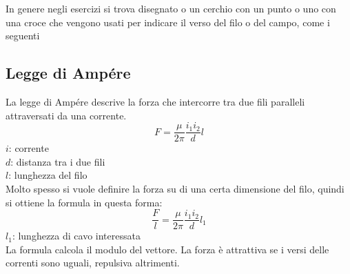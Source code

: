 In genere negli esercizi si trova disegnato o un cerchio con un punto o uno con una croce che
vengono usati per indicare il verso del filo o del campo, come i seguenti

\begin{center}
\end{center}

\subsection{Legge di Ampére}
La legge di Ampére descrive la forza che intercorre tra due fili paralleli attraversati da una
corrente.
\begin{equation*}
F = \frac{\mu}{2\pi}\frac{i_1i_2}{d}l
\end{equation*}
$i$: corrente\\
$d$: distanza tra i due fili\\
$l$: lunghezza del filo\\ [\baselineskip]
Molto spesso si vuole definire la forza su di una certa dimensione del filo, quindi si ottiene
la formula in questa forma:
\begin{equation*}
\frac{F}{l} = \frac{\mu}{2\pi}\frac{i_1i_2}{d}l_1
\end{equation*}
$l_1$: lunghezza di cavo interessata\\ [\baselineskip]
La formula calcola il modulo del vettore. La forza è attrattiva se i versi delle correnti sono 
uguali, repulsiva altrimenti.

